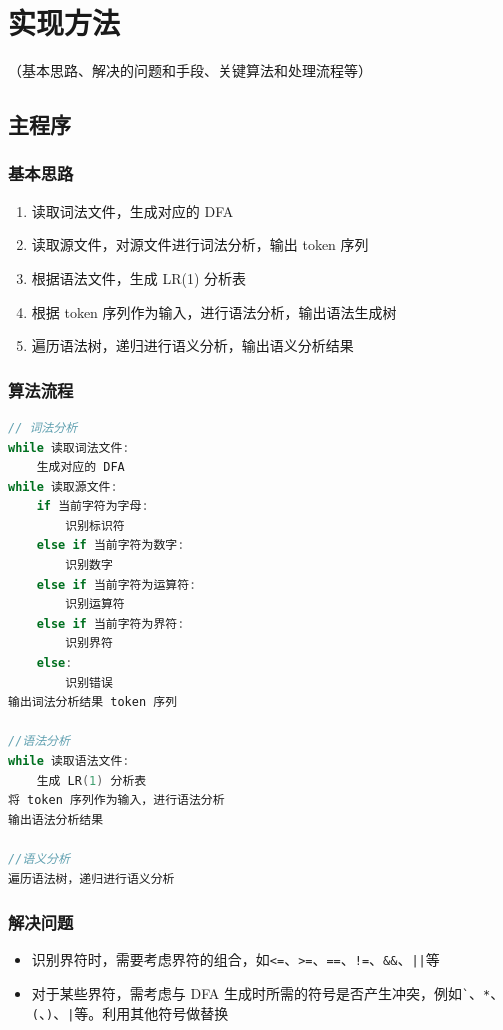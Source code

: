 \documentclass[cs4size,a4paper]{ctexart}
\begin{document}
\section{实现方法}（基本思路、解决的问题和手段、关键算法和处理流程等）
\subsection{主程序}
\subsubsection{基本思路}
\begin{enumerate}
    \item 读取词法文件，生成对应的 DFA
    \item 读取源文件，对源文件进行词法分析，输出 token 序列
    \item 根据语法文件，生成 LR(1) 分析表
    \item 根据 token 序列作为输入，进行语法分析，输出语法生成树
    \item 遍历语法树，递归进行语义分析，输出语义分析结果
\end{enumerate}
\subsubsection{算法流程}
\begin{lstlisting}[language=c++]
// 词法分析
while 读取词法文件:
    生成对应的 DFA 
while 读取源文件:
    if 当前字符为字母:
        识别标识符
    else if 当前字符为数字:
        识别数字
    else if 当前字符为运算符:
        识别运算符
    else if 当前字符为界符:
        识别界符
    else:
        识别错误
输出词法分析结果 token 序列

//语法分析
while 读取语法文件:
    生成 LR(1) 分析表
将 token 序列作为输入，进行语法分析
输出语法分析结果

//语义分析
遍历语法树，递归进行语义分析

\end{lstlisting}
\subsubsection{解决问题}
\begin{itemize}
    \item 识别界符时，需要考虑界符的组合，如\lstinline{<=}、\lstinline{>=}、\lstinline{==}、\lstinline{!=}、\lstinline{&&}、\lstinline{||}等
    \item 对于某些界符，需考虑与 DFA 生成时所需的符号是否产生冲突，例如\lstinline{`}、\lstinline{*}、\lstinline{(}、\lstinline{)}、\lstinline{|}等。利用其他符号做替换
\end{itemize}
\end{document}
